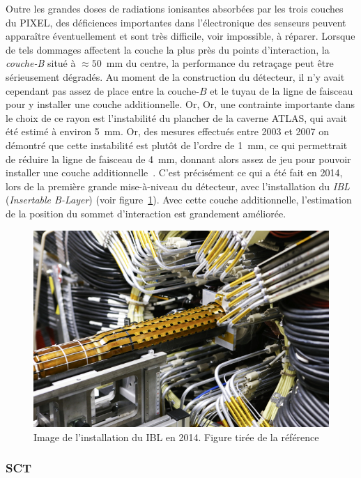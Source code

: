 Outre les grandes doses de radiations ionisantes absorbées par les
trois couches du PIXEL, des déficiences importantes dans
l'électronique des senseurs peuvent apparaître éventuellement et sont
très difficile, voir impossible, à réparer. Lorsque de tels dommages
affectent la couche la plus près du points d'interaction, la
\emph{couche-B} situé à $\approx 50$~mm du centre, la performance du
retraçage peut être sérieusement dégradés. Au moment de la
construction du détecteur, il n'y avait cependant pas assez de place
entre la couche-$B$ et le tuyau de la ligne de faisceau pour y
installer une couche additionnelle. Or, Or, une contrainte importante
dans le choix de ce rayon est l'instabilité du plancher de la caverne
ATLAS, qui avait été estimé à environ 5~mm. Or, des mesures effectués
entre 2003 et 2007 on démontré que cette instabilité est plutôt de
l'ordre de 1~mm, ce qui permettrait de réduire la ligne de faisceau de
4~mm, donnant alors assez de jeu pour pouvoir installer une couche
additionnelle~\cite{capeans_atlas_2010}. C'est précisément ce qui a été
fait en 2014, lors de la première grande mise-à-niveau du détecteur,
avec l'installation du \emph{IBL} (\emph{Insertable B-Layer}) (voir
figure~\ref{fig:ibl}). Avec cette couche additionnelle, l'estimation de
la position du sommet d'interaction est grandement améliorée.

\begin{figure}[h!]
  \centering
  \includegraphics{ibl.jpg}
  \caption{Image de l'installation du IBL en 2014. Figure tirée de la référence~\cite{MarcelloniDeOliveira:1702006}}
  \label{fig:ibl}
\end{figure}

\subsubsection{SCT}

